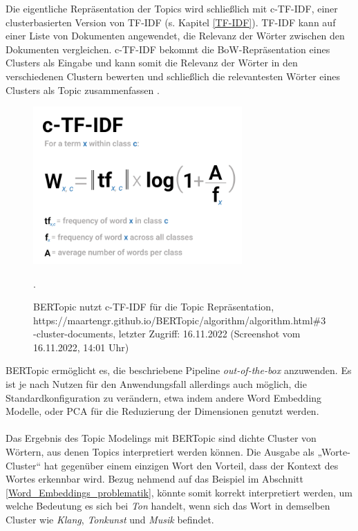 \documentclass[ngerman]{ttlab-qualify}
\begin{document}
Die eigentliche Repräsentation der Topics wird schließlich mit c-TF-IDF, einer clusterbasierten Version von TF-IDF (s. Kapitel \ref{TF-IDF}). TF-IDF kann auf einer Liste von Dokumenten angewendet, die Relevanz der Wörter zwischen den Dokumenten vergleichen. c-TF-IDF bekommt die BoW-Repräsentation eines Clusters als Eingabe und kann somit die Relevanz der Wörter in den verschiedenen Clustern bewerten und schließlich die relevantesten Wörter eines Clusters als Topic zusammenfassen \parencite{bertopic}. 
\begin{figure}[H]
\begin{center}
\includegraphics[width=8cm]{grafiken/c-tf-idf.png}
\caption[BERTopic nutzt c-TF-IDF für die Topic Repräsentation]{BERTopic nutzt c-TF-IDF für die Topic Repräsentation, \\https://maartengr.github.io/BERTopic/algorithm/algorithm.html\#3-cluster-documents, letzter Zugriff: 16.11.2022 (Screenshot vom 16.11.2022, 14:01 Uhr)}.
\label{Pipeline}
\end{center}
\end{figure}
\noindent BERTopic ermöglicht es, die beschriebene Pipeline \textit{out-of-the-box} anzuwenden. Es ist je nach Nutzen für den Anwendungsfall allerdings auch möglich, die Standardkonfiguration zu verändern, etwa indem andere Word Embedding Modelle, oder PCA für die Reduzierung der Dimensionen genutzt werden.\\
\\
Das Ergebnis des Topic Modelings mit BERTopic sind dichte Cluster von Wörtern, aus denen Topics interpretiert werden können. Die Ausgabe als „Worte-Cluster“ hat gegenüber einem einzigen Wort den Vorteil, dass der Kontext des Wortes erkennbar wird. Bezug nehmend auf das Beispiel im Abschnitt \ref{Word_Embeddings_problematik}, könnte somit korrekt interpretiert werden, um welche Bedeutung es sich bei \textit{Ton} handelt, wenn sich das Wort in demselben Cluster wie \textit{Klang}, \textit{Tonkunst} und \textit{Musik} befindet.
\end{document}
